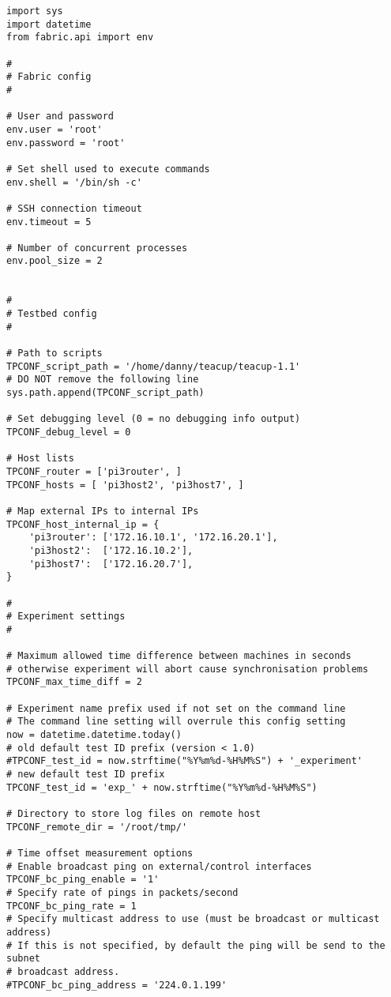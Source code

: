 \begin{code}
\begin{verbatim}
import sys
import datetime
from fabric.api import env

#
# Fabric config
#

# User and password
env.user = 'root'
env.password = 'root'

# Set shell used to execute commands
env.shell = '/bin/sh -c'

# SSH connection timeout
env.timeout = 5

# Number of concurrent processes
env.pool_size = 2


#
# Testbed config
#

# Path to scripts
TPCONF_script_path = '/home/danny/teacup/teacup-1.1'
# DO NOT remove the following line
sys.path.append(TPCONF_script_path)

# Set debugging level (0 = no debugging info output) 
TPCONF_debug_level = 0

# Host lists
TPCONF_router = ['pi3router', ]
TPCONF_hosts = [ 'pi3host2', 'pi3host7', ]

# Map external IPs to internal IPs
TPCONF_host_internal_ip = {
    'pi3router': ['172.16.10.1', '172.16.20.1'],
    'pi3host2':  ['172.16.10.2'],
    'pi3host7':  ['172.16.20.7'],
}

#
# Experiment settings
#

# Maximum allowed time difference between machines in seconds
# otherwise experiment will abort cause synchronisation problems
TPCONF_max_time_diff = 2

# Experiment name prefix used if not set on the command line
# The command line setting will overrule this config setting
now = datetime.datetime.today()
# old default test ID prefix (version < 1.0)
#TPCONF_test_id = now.strftime("%Y%m%d-%H%M%S") + '_experiment'
# new default test ID prefix
TPCONF_test_id = 'exp_' + now.strftime("%Y%m%d-%H%M%S")

# Directory to store log files on remote host
TPCONF_remote_dir = '/root/tmp/'

# Time offset measurement options
# Enable broadcast ping on external/control interfaces
TPCONF_bc_ping_enable = '1'
# Specify rate of pings in packets/second
TPCONF_bc_ping_rate = 1
# Specify multicast address to use (must be broadcast or multicast address)
# If this is not specified, by default the ping will be send to the subnet
# broadcast address.
#TPCONF_bc_ping_address = '224.0.1.199'


\end{verbatim}
\end{code}
